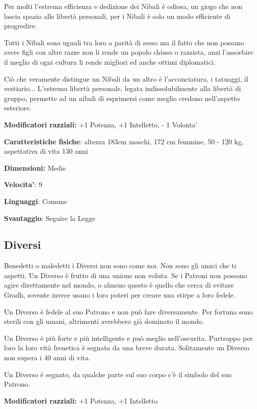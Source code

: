 \documentclass[a4paper,11pt,twoside,openany]{book}
\begin{document}
Per molti l'estrema efficienza e dedizione dei Nibali è odiosa, un giogo che non lascia spazio alle libertà personali, per i Nibali è solo un modo efficiente di progredire.

Tutti i Nibali sono uguali tra loro a parità di sesso ma il fatto che non possano avere figli con altre razze non li rende un popolo chiuso o razzista, anzi l'assorbire il meglio di ogni cultura li rende migliori ed anche ottimi diplomatici. 

Ciò che veramente distingue un Nibali da un altro è l'acconciatura, i tatuaggi, il vestiario... L'estrema libertà personale, legata indissolubilmente alla libertà di gruppo, permette ad un nibali di esprimersi come meglio credono nell'aspetto esteriore.

\textbf{Modificatori razziali:} +1 Potenza, +1 Intelletto, - 1 Volonta'

\textbf{Caratteristiche fisiche}: altezza 183cm maschi, 172 cm femmine, 50 - 120 kg, aspettativa di vita 130 anni

\textbf{Dimensioni:} Medie

\textbf{Velocita'}: 9

\textbf{Linguaggi}: Comune

\textbf{Svantaggio}: Seguire la Legge

\subsection{Diversi}

\label{diversi}

Benedetti o maledetti i Diversi non sono come noi. Non sono gli amici che ti aspetti. Un Diverso è frutto di una unione non voluta. Se i Patroni non possono agire direttamente nel mondo, o almeno questo è quello che cerca di evitare Gradh, sovente invece usano i loro poteri per creare una stirpe a loro fedele.

Un Diverso è fedele al suo Patrono e non può fare diversamente. Per fortuna sono sterili con gli umani, altrimenti avrebbero già dominato il mondo.

Un Diverso è più forte e più intelligente e può meglio nell'oscurita. Purtroppo per loro la loro vità frenetica è segnata da una breve durata. Solitamente un Diverso non supera i 40 anni di vita.

Un Diverso è segnato, da qualche parte sul suo corpo c'è il simbolo del suo Patrono.

\textbf{Modificatori razziali:} +1 Potenza, +1 Intelletto
\end{document}
